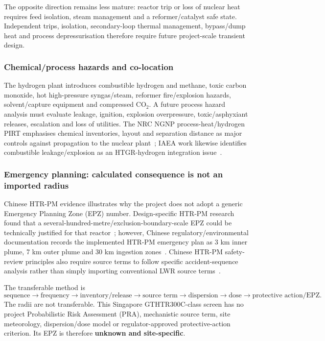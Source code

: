 The opposite direction remains less mature: reactor trip or loss of nuclear heat requires feed isolation, steam management and a reformer/catalyst safe state.  Independent trips, isolation, secondary-loop thermal management, bypass/dump heat and process depressurisation therefore require future project-scale transient design.

\subsubsection{Chemical/process hazards and co-location}
The hydrogen plant introduces combustible hydrogen and methane, toxic carbon monoxide, hot high-pressure syngas/steam, reformer fire/explosion hazards, solvent/capture equipment and compressed CO$_2$. A future process hazard analysis must evaluate leakage, ignition, explosion overpressure, toxic/asphyxiant releases, escalation and loss of utilities. The NRC NGNP process-heat/hydrogen PIRT emphasises chemical inventories, layout and separation distance as major controls against propagation to the nuclear plant~\cite{nrcngnppirt2010}; IAEA work likewise identifies combustible leakage/explosion as an HTGR-hydrogen integration issue~\cite{iaeacoupling2009}.

\subsubsection{Emergency planning: calculated consequence is not an imported radius}
Chinese HTR-PM evidence illustrates why the project does not adopt a generic Emergency Planning Zone (EPZ) number.  Design-specific HTR-PM research found that a several-hundred-metre/exclusion-boundary-scale EPZ could be technically justified for that reactor~\cite{ding2018epz}; however, Chinese regulatory/environmental documentation records the implemented HTR-PM emergency plan as 3 km inner plume, 7 km outer plume and 30 km ingestion zones~\cite{mee2022htrpmepz}.  Chinese HTR-PM safety-review principles also require source terms to follow specific accident-sequence analysis rather than simply importing conventional LWR source terms~\cite{mee2009htrpmreview}.

The transferable method is
\[
\text{sequence}\rightarrow\text{frequency}\rightarrow\text{inventory/release}
\rightarrow\text{source term}\rightarrow\text{dispersion}\rightarrow\text{dose}
\rightarrow\text{protective action/EPZ}.
\]
The radii are not transferable.  This Singapore GTHTR300C-class screen has no project Probabilistic Risk Assessment (PRA), mechanistic source term, site meteorology, dispersion/dose model or regulator-approved protective-action criterion.  Its EPZ is therefore \textbf{unknown and site-specific}.

